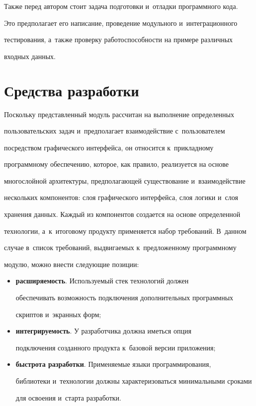    Также перед автором стоит задача подготовки и~отладки программного кода. 


Это предполагает его написание, проведение модульного и~интеграционного 


тес\-ти\-ро\-ва\-ния, а~также проверку ра\-бо\-то\-спо\-соб\-ности на примере различных 


входных данных.





\section{Средства разработки}





   Поскольку представленный модуль рассчитан на выполнение определенных 


пользовательских задач и~предполагает взаимодействие с~пользователем 


посредством графического интерфейса, он относится к~при\-клад\-но\-му 


про\-грам\-мно\-му обеспечению, которое, как правило, реализуется на основе 


многослойной архитектуры, пред\-по\-ла\-га\-ющей существование и~взаимодействие 


нескольких компонентов: слоя графического интерфейса, слоя логики и~слоя 


хранения данных. Каждый из компонентов создается на основе определенной 


технологии, а~к~итоговому продукту применяется набор требований. В~данном 


случае в~список требований, выдвигаемых к~предложенному программному 


модулю, мож\-но внес\-ти сле\-ду\-ющие позиции:


   \begin{itemize}


\item \textbf{расширяемость}. Используемый стек технологий должен 


обеспечивать воз\-мож\-ность подключения дополнительных программных 


скриптов и~экранных форм;


\item \textbf{интегрируемость}. У разработчика должна иметься опция 


подключения созданного продукта к~базовой версии приложения;


\item \textbf{быстрота разработки}. Применяемые языки программирования, 


библиотеки и~технологии должны характеризоваться минимальными сроками 


для освоения и~старта разработки.


\end{itemize}


